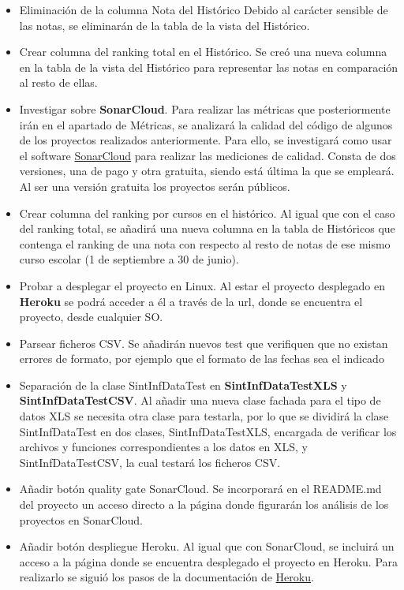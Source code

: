 \begin{itemize}
	\tightlist
	\item Eliminación de la columna Nota del Histórico
		Debido al carácter sensible de las notas, se eliminarán de la tabla de la vista del Histórico.
	\item Crear columna del ranking total en el Histórico. 
		Se creó una nueva columna en la tabla de la vista del Histórico para representar las notas en comparación al resto de ellas.
	\item Investigar sobre \textbf{SonarCloud}. 
		Para realizar las métricas que posteriormente irán en el apartado de Métricas, se analizará la calidad del código de algunos de los proyectos realizados anteriormente. Para ello, se investigará como usar el software \href{https://sonarcloud.io/}{SonarCloud} para realizar las mediciones de calidad. Consta de dos versiones, una de pago y otra gratuita, siendo está última la que se empleará. Al ser una versión gratuita los proyectos serán públicos. 
	\item Crear columna del ranking por cursos en el histórico. 
		Al igual que con el caso del ranking total, se añadirá una nueva columna en la tabla de Históricos que contenga el ranking de una nota con respecto al resto de notas de ese mismo curso escolar (1 de septiembre a 30 de junio). 
	\item Probar a desplegar el proyecto en Linux.
	 	Al estar el proyecto desplegado en \textbf{Heroku} se podrá acceder a él a través de la url, donde se encuentra el proyecto, desde cualquier SO.
	\item Parsear ficheros CSV. 
		Se añadirán nuevos test que verifiquen que no existan errores de formato, por ejemplo que el formato de las fechas sea el indicado
	\item Separación de la clase SintInfDataTest en \textbf{SintInfDataTestXLS} y \textbf{SintInfDataTestCSV}.
		 Al añadir una nueva clase fachada para el tipo de datos XLS se necesita otra clase para testarla, por lo que se dividirá la clase SintInfDataTest en dos clases, SintInfDataTestXLS, encargada de verificar los archivos y funciones correspondientes a los datos en XLS, y SintInfDataTestCSV, la cual testará los ficheros CSV.
	 \item Añadir botón quality gate SonarCloud. 
		 Se incorporará en el README.md del proyecto un acceso directo a la página donde figurarán los análisis de los proyectos en SonarCloud. 
	 \item Añadir botón despliegue Heroku.
	  	Al igual que con SonarCloud, se incluirá un acceso a la página donde se encuentra desplegado el proyecto en Heroku. Para realizarlo se siguió los pasos de la documentación de \href{https://devcenter.heroku.com/articles/heroku-button}{Heroku}.

\end{itemize}
